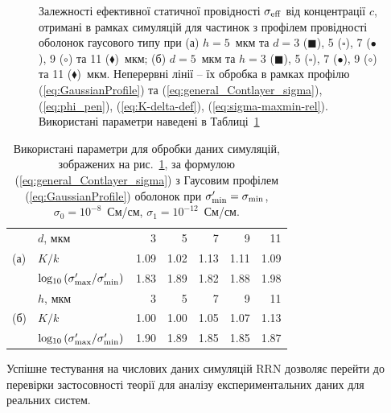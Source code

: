 \documentclass[14pt,twoside]{vakthesis}
\begin{document}
\begin{figure}[tb]
\begin{subfigure}[c]{0.48\textwidth}
	\end{subfigure}
	\caption{\label{fig:simulations-sigma-Glayer2006} Залежності ефективної статичної провідності $\sigma_{\rm eff}$ від концентрації $c$, отримані в рамках симуляцій \cite{Siekierski2006} для частинок з профілем провідності оболонок гаусового типу при (а) $h = 5$~мкм та $d = 3$ ($\blacksquare$), 5 ($\square$), 7 ($\bullet$), 9 ($\circ$) та 11 ($\blacklozenge$)~мкм; (б) $d = 5$~мкм та $h = 3$ ($\blacksquare$), 5 ($\square$), 7 ($\bullet$), 9 ($\circ$) та 11 ($\blacklozenge$)~мкм. Неперервні лінії -- їх обробка в рамках профілю (\ref{eq:GaussianProfile}) та (\ref{eq:general_Contlayer_sigma}), (\ref{eq:phi_pen}), (\ref{eq:K-delta-def}), (\ref{eq:sigma-maxmin-rel}). Використані параметри наведені в Таблиці~\ref{tab:numerical-inhomogeneous-1}}
\end{figure}

\begin{table}[htb]
	\caption{\label{tab:numerical-inhomogeneous-1} Використані параметри для обробки даних симуляцій, зображених на рис.~\ref{fig:simulations-sigma-Glayer2006}, за формулою (\ref{eq:general_Contlayer_sigma}) з Гаусовим профілем  (\ref{eq:GaussianProfile}) оболонок при $\sigma'_{\rm min} = \sigma_{\rm min}$, $\sigma_0 = 10^{-8}$~См/см, $\sigma_1 = 10^{-12}$~См/см.}
	\begin{center}
		\begin{tabular}{|l|l|r|r|r|r|r|}
			\hline
			\multirow{3}{*}{(а)} & $d$, мкм & 3    & 5    & 7     & 9     & 11    \\ \cline{2-7}
			& $K/k$    & 1.09 & 1.02 & 1.13  & 1.11  & 1.09   \\ 
			\cline{2-7}
			& ${\rm log_{10}}\left(\sigma'_{\rm max}/\sigma'_{\rm min}\right)$
			& 1.83 & 1.89 & 1.82 & 1.88 & 1.98\\
			\hline
			\multirow{3}{*}{(б)} & $h$, мкм & 3    & 5    & 7     & 9     & 11    \\ \cline{2-7}
			& $K/k$    & 1.00  & 1.00  & 1.05 & 1.07 & 1.13  \\ \cline{2-7}
			& ${\rm log_{10}}\left(\sigma'_{\rm max}/\sigma'_{\rm min}\right)$
			& 1.90  & 1.89  & 1.85 & 1.85 & 1.87 \\
			\hline
		\end{tabular}
	\end{center}
\end{table}

Успішне тестування на числових даних симуляцій RRN дозволяє перейти до перевірки застосовності теорії для аналізу експериментальних даних для реальних систем. 
\end{document}
